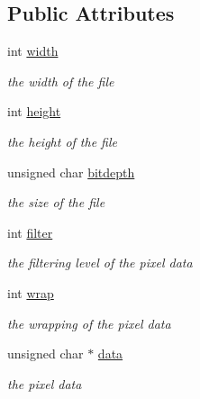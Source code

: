 \subsection*{Public Attributes}
\begin{DoxyCompactItemize}
\item 
\mbox{\label{struct_pixel_buffer_a11764e5814688eee587fe639e292266e}} 
int \hyperlink{struct_pixel_buffer_a11764e5814688eee587fe639e292266e}{width}
\begin{DoxyCompactList}\small\item\em the width of the file \end{DoxyCompactList}\item 
\mbox{\label{struct_pixel_buffer_abd9307aede7aa417f0e0d2a0158a9e86}} 
int \hyperlink{struct_pixel_buffer_abd9307aede7aa417f0e0d2a0158a9e86}{height}
\begin{DoxyCompactList}\small\item\em the height of the file \end{DoxyCompactList}\item 
unsigned char \hyperlink{struct_pixel_buffer_aed6c6d8d7043e79be814be447dec108e}{bitdepth}
\begin{DoxyCompactList}\small\item\em the size of the file \end{DoxyCompactList}\item 
int \hyperlink{struct_pixel_buffer_a849bcca202ec73555873cbc46b0f3cd0}{filter}
\begin{DoxyCompactList}\small\item\em the filtering level of the pixel data \end{DoxyCompactList}\item 
int \hyperlink{struct_pixel_buffer_acb981d89a79a2ec8f755ee42c776552c}{wrap}
\begin{DoxyCompactList}\small\item\em the wrapping of the pixel data \end{DoxyCompactList}\item 
\mbox{\label{struct_pixel_buffer_ab94577291f3f926bffbc591c871922e4}} 
unsigned char $\ast$ \hyperlink{struct_pixel_buffer_ab94577291f3f926bffbc591c871922e4}{data}
\begin{DoxyCompactList}\small\item\em the pixel data \end{DoxyCompactList}\end{DoxyCompactItemize}


